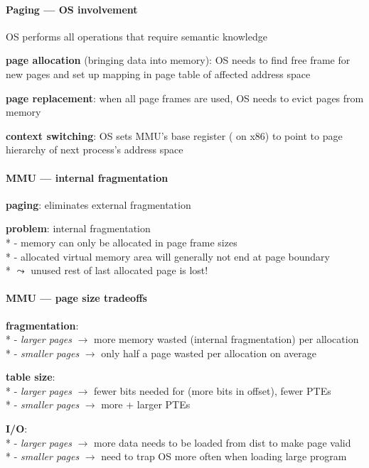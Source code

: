 \paragraph{Paging --- OS involvement}
\begin{items}
  \item OS performs all operations that require semantic knowledge
  \item \textbf{page allocation} (bringing data into memory): OS needs to find free frame for new pages and set up mapping in page table of affected address space
  \item \textbf{page replacement}: when all page frames are used, OS needs to evict pages from memory
  \item \textbf{context switching}: OS sets MMU's base register ( on x86) to point to page hierarchy of next process's address space
\end{items}

\paragraph{MMU --- internal fragmentation}
\begin{items}
  \item \textbf{paging}: eliminates external fragmentation
  \item \textbf{problem}: internal fragmentation \\*
    - memory can only be allocated in page frame sizes \\*
    - allocated virtual memory area will generally not end at page boundary \\*
    \( \leadsto \) unused rest of last allocated page is lost!
\end{items}

\paragraph{MMU --- page size tradeoffs}
\begin{items}
  \item \textbf{fragmentation}: \\*
    - \emph{larger pages} \( \to \) more memory wasted (internal fragmentation) per allocation \\*
    - \emph{smaller pages} \( \to \) only half a page wasted per allocation on average
  \item \textbf{table size}: \\*
    - \emph{larger pages} \( \to \) fewer bits needed for  (more bits in offset), fewer PTEs \\*
    - \emph{smaller pages} $ \to $ more + larger PTEs
  \item \textbf{I/O}: \\*
    - \emph{larger pages} $ \to $ more data needs to be loaded from dist to make page valid \\*
    - \emph{smaller pages} $ \to $ need to trap OS more often when loading large program
\end{items}